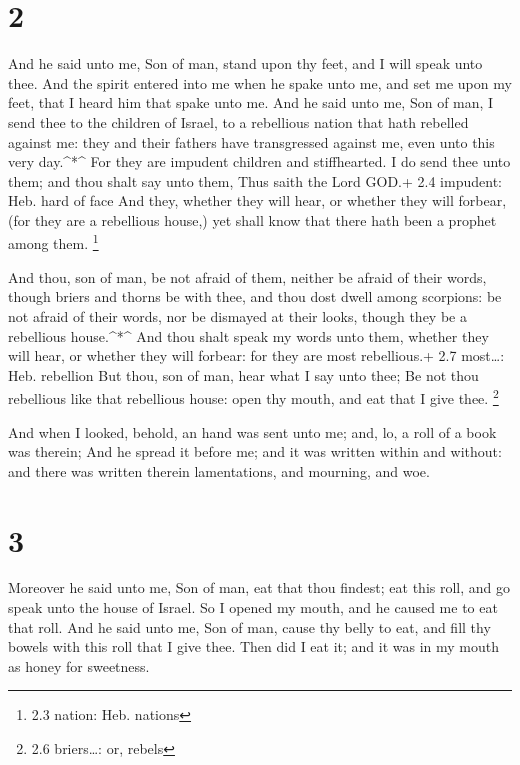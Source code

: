 \hypertarget{section-1}{%
\section{2}\label{section-1}}

 And he said unto me, Son of man, stand upon thy feet, and I
will speak unto thee.  And the spirit entered into me when
he spake unto me, and set me upon my feet, that I heard him that spake
unto me.  And he said unto me, Son of man, I send thee to
the children of Israel, to a rebellious nation that hath rebelled
against me: they and their fathers have transgressed against me, even
unto this very day.\^{}*\^{}  For they are impudent children
and stiffhearted. I do send thee unto them; and thou shalt say unto
them, Thus saith the Lord GOD.+ 2.4 impudent: Heb. hard of face
 And they, whether they will hear, or whether they will
forbear, (for they are a rebellious house,) yet shall know that there
hath been a prophet among them. \footnote{2.3 nation: Heb. nations}

 And thou, son of man, be not afraid of them, neither be
afraid of their words, though briers and thorns be with thee, and thou
dost dwell among scorpions: be not afraid of their words, nor be
dismayed at their looks, though they be a rebellious house.\^{}*\^{}
 And thou shalt speak my words unto them, whether they will
hear, or whether they will forbear: for they are most rebellious.+ 2.7
most\ldots: Heb. rebellion  But thou, son of man, hear what
I say unto thee; Be not thou rebellious like that rebellious house: open
thy mouth, and eat that I give thee. \footnote{2.6 briers\ldots: or,
  rebels}

 And when I looked, behold, an hand was sent unto me; and,
lo, a roll of a book was therein;  And he spread it before
me; and it was written within and without: and there was written therein
lamentations, and mourning, and woe.

\hypertarget{section-2}{%
\section{3}\label{section-2}}

 Moreover he said unto me, Son of man, eat that thou
findest; eat this roll, and go speak unto the house of Israel.
 So I opened my mouth, and he caused me to eat that roll.
 And he said unto me, Son of man, cause thy belly to eat,
and fill thy bowels with this roll that I give thee. Then did I eat it;
and it was in my mouth as honey for sweetness.

